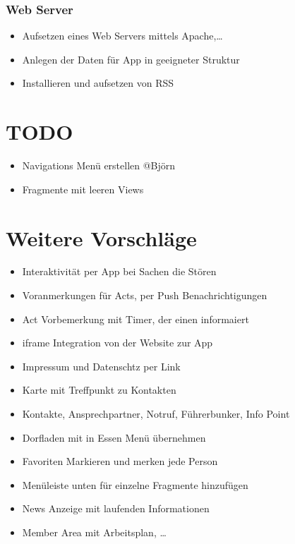 \documentclass[a4paper,12pt,
headsepline,           %
oneside,               %
pointlessnumbers,      %
bibtotoc,              %
BCOR15mm               %
]{scrbook}
\begin{document}
  \subsubsection*{Web Server}
  \begin{itemize}
      \item Aufsetzen eines Web Servers mittels Apache,\dots
      \item Anlegen der Daten für App in geeigneter Struktur
      \item Installieren und aufsetzen von RSS
  \end{itemize}

  \section*{TODO}
  \begin{itemize}
    \item Navigations Menü erstellen @Björn
    \item Fragmente mit leeren Views
  \end{itemize}

  \section*{Weitere Vorschläge}
  \begin{itemize}
    \item Interaktivität per App bei Sachen die Stören
    \item Voranmerkungen für Acts, per Push Benachrichtigungen
    \item Act Vorbemerkung mit Timer, der einen informaiert
    \item iframe Integration von der Website zur App
    \item Impressum und Datenschtz per Link
    \item Karte mit Treffpunkt zu Kontakten
    \item Kontakte, Ansprechpartner, Notruf, Führerbunker, Info Point
    \item Dorfladen mit in Essen Menü übernehmen
    \item Favoriten Markieren und merken jede Person
    \item Menüleiste unten für einzelne Fragmente hinzufügen
    \item News Anzeige mit laufenden Informationen
    \item Member Area mit Arbeitsplan, \dots
  \end{itemize}
\end{document}
